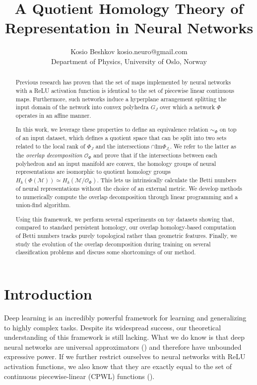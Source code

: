 \documentclass[10pt]{article} %
\title{A Quotient Homology Theory of Representation in Neural Networks}
\author{\name Kosio Beshkov \email kosio.neuro@gmail.com \\
  \addr Department of Physics, 
  University of Oslo, Norway}
\theoremstyle{plain}
\theoremstyle{definition}
\theoremstyle{remark}
\begin{document}
\maketitle

\begin{abstract}
Previous research has proven that the set of maps implemented by neural networks with a ReLU activation function is identical to the set of piecewise linear continuous maps. Furthermore, such networks induce a hyperplane arrangement splitting the input domain of the network into convex polyhedra $G_J$ over which a network $\Phi$ operates in an affine manner. 

In this work, we leverage these properties to define an equivalence relation $\sim_\Phi$ on top of an input dataset, {which defines a quotient space that} can be split into two sets related to the local rank of $\Phi_J$ and the intersections $\cap \text{Im}\Phi_{J_i}$. We refer to the latter as the \textit{overlap decomposition} $\mathcal{O}_\Phi$ and prove that if the intersections between each polyhedron and an input manifold are convex, the homology groups of neural representations are isomorphic to quotient homology groups $H_k(\Phi(\mathcal{M})) \simeq H_k(\mathcal{M}/\mathcal{O}_\Phi)$. This lets us intrinsically calculate the Betti numbers of neural representations without the choice of an external metric. We develop methods to numerically compute the overlap decomposition through linear programming and a union-find algorithm.

Using this framework, we perform several experiments on toy datasets showing that, compared to standard persistent homology, our overlap homology-based computation of Betti numbers tracks purely topological rather than geometric features. Finally, we study the evolution of the overlap decomposition during training on several classification problems and discuss some shortcomings of our method.
\end{abstract}

\section{Introduction}
\label{Introduction}

Deep learning is an incredibly powerful framework for learning and generalizing to highly complex tasks. Despite its widespread success, our theoretical understanding of this framework is still lacking. What we do know is that deep neural networks are universal approximators (\cite{hornik1991approximation}) and therefore have unbounded expressive power. If we further restrict ourselves to neural networks with ReLU activation functions, we also know that they are exactly equal to the set of continuous piecewise-linear (CPWL) functions (\cite{arora2016understanding}). 
\end{document}
